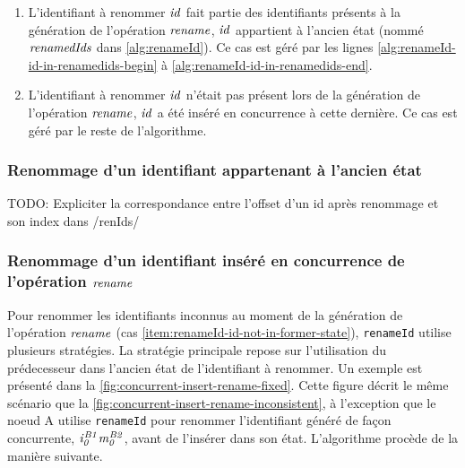\begin{enumerate}
    \item L'identifiant à renommer $\mathit{id}$ fait partie des identifiants présents à la génération de l'opération $\mathit{rename}$, \ie $\mathit{id}$ appartient à l'ancien état (nommé $\mathit{renamedIds}$ dans \autoref{alg:renameId}).
        Ce cas est géré par les lignes \ref{alg:renameId-id-in-renamedids-begin} à \ref{alg:renameId-id-in-renamedids-end}.
        \label{item:renameId-id-in-former-state}
    \item L'identifiant à renommer $\mathit{id}$ n'était pas présent lors de la génération de l'opération $\mathit{rename}$, \ie $\mathit{id}$ a été inséré en concurrence à cette dernière\footnotemark.
        Ce cas est géré par le reste de l'algorithme.
        \label{item:renameId-id-not-in-former-state}
\end{enumerate}

\subsubsection{Renommage d'un identifiant appartenant à l'ancien état}

TODO: Expliciter la correspondance entre l'offset d'un id après renommage et son index dans /renIds/

\subsubsection{Renommage d'un identifiant inséré en concurrence de l'opération $\mathit{rename}$}

Pour renommer les identifiants inconnus au moment de la génération de l'opération $\mathit{rename}$ (cas \ref{item:renameId-id-not-in-former-state}), \texttt{renameId} utilise plusieurs stratégies.
La stratégie principale repose sur l'utilisation du prédecesseur dans l'ancien état de l'identifiant à renommer.
Un exemple est présenté dans la \autoref{fig:concurrent-insert-rename-fixed}.
Cette figure décrit le même scénario que la \autoref{fig:concurrent-insert-rename-inconsistent}, à l'exception que le noeud A utilise \texttt{renameId} pour renommer l'identifiant généré de façon concurrente, $\mathit{i}^{\mathit{B1}}_{\mathit{0}}\mathit{m}^{\mathit{B2}}_{\mathit{0}}$, avant de l'insérer dans son état.
L'algorithme procède de la manière suivante.

